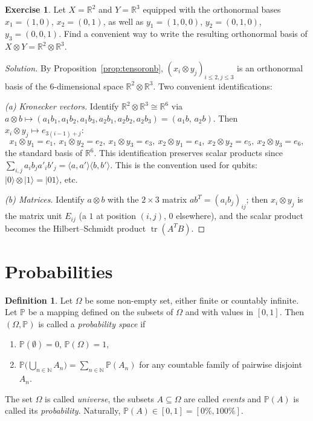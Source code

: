 \documentclass[11pt,a4paper]{article}
\numberwithin{equation}{section}
\newcommand{\N}{\mathbb{N}}
\newcommand{\R}{\mathbb{R}}
\newcommand{\PP}{\mathbb{P}}
\newcommand{\ip}[2]{\langle #1, #2\rangle}
\newcommand{\ket}[1]{|#1\rangle}
\DeclareMathOperator{\tr}{tr}
\theoremstyle{plain}
\theoremstyle{definition}
\newtheorem{definition}[theorem]{Definition}
\newtheorem{exercise}[theorem]{Exercise}
\theoremstyle{plain}
\theoremstyle{definition}
\newenvironment{solution}{\begin{proof}[Solution]}{\end{proof}}
\begin{document}
\begin{exercise}
Let $X=\R^2$ and $Y=\R^3$ equipped with the orthonormal bases $x_1=(1,0)$, $x_2=(0,1)$, as
well as $y_1=(1,0,0)$, $y_2=(0,1,0)$, $y_3=(0,0,1)$. Find a convenient way to write the
resulting orthonormal basis of $X\otimes Y=\R^2\otimes\R^3$.
\end{exercise}
\begin{solution}
By Proposition~\ref{prop:tensoronb}, $(x_i\otimes y_j)_{i\le2,j\le3}$ is an orthonormal
basis of the 6-dimensional space $\R^2\otimes\R^3$. Two convenient identifications:

\emph{(a) Kronecker vectors.} Identify $\R^2\otimes\R^3\cong\R^6$ via
$a\otimes b\mapsto(a_1b_1,a_1b_2,a_1b_3,a_2b_1,a_2b_2,a_2b_3)=(a_1b,\,a_2b)$. Then
$x_i\otimes y_j\mapsto e_{3(i-1)+j}$:
\[
x_1\otimes y_1=e_1,\ x_1\otimes y_2=e_2,\ x_1\otimes y_3=e_3,\
x_2\otimes y_1=e_4,\ x_2\otimes y_2=e_5,\ x_2\otimes y_3=e_6,
\]
the standard basis of $\R^6$. This identification preserves scalar products since
$\sum_{i,j}a_ib_ja'_ib'_j=\ip{a}{a'}\ip{b}{b'}$. This is the convention used for qubits:
$\ket{0}\otimes\ket{1}=\ket{01}$, etc.

\emph{(b) Matrices.} Identify $a\otimes b$ with the $2\times3$ matrix $ab^T=(a_ib_j)_{ij}$;
then $x_i\otimes y_j$ is the matrix unit $E_{ij}$ (a $1$ at position $(i,j)$, $0$
elsewhere), and the scalar product becomes the Hilbert--Schmidt product $\tr(A^TB)$.
\end{solution}
\section{Probabilities}

\begin{definition}\label{def:prob}
Let $\Omega$ be some non-empty set, either finite or countably infinite. Let $\PP$ be a
mapping defined on the subsets of $\Omega$ and with values in $[0,1]$. Then $(\Omega,\PP)$
is called a \emph{probability space} if
\begin{enumerate}
\item $\PP(\emptyset)=0$, $\PP(\Omega)=1$,
\item $\PP\big(\bigcup_{n\in\N}A_n\big)=\sum_{n\in\N}\PP(A_n)$ for any countable family of
pairwise disjoint $A_n$.
\end{enumerate}
The set $\Omega$ is called \emph{universe}, the subsets $A\subseteq\Omega$ are called
\emph{events} and $\PP(A)$ is called its \emph{probability}. Naturally,
$\PP(A)\in[0,1]=[0\%,100\%]$.
\end{definition}
\end{document}
